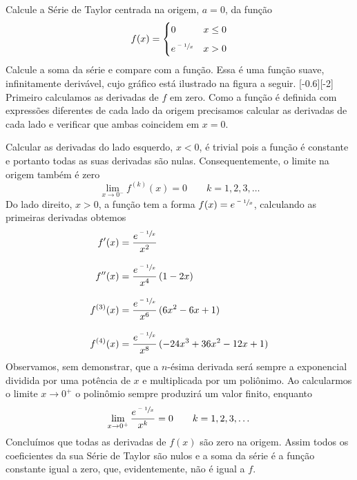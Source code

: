 \begin{example}
  Calcule a Série de Taylor centrada na origem, $a=0$, da função
  \[
    f(x) = \begin{cases}
      0                 & x \leq 0 \\[2mm]
      e^{\sfrac{-1}{x}} & x > 0
    \end{cases}
  \]
  Calcule a soma da série e compare com a função.
  \solution
  Essa é uma função suave, infinitamente derivável, cujo gráfico está
  ilustrado na figura a seguir.
  [-0.6][-2]
  Primeiro calculamos as derivadas de $f$ em zero. Como a função é definida
  com expressões diferentes de cada lado da origem precisamos calcular as derivadas
  de cada lado e verificar que ambas coincidem em $x=0$.

  Calcular as derivadas do lado esquerdo, $x<0$, é trivial pois a função é constante
  e portanto todas as suas derivadas são nulas. Consequentemente, o limite
  na origem também é zero
  \[
    \lim_{x\to 0^-} f^{(k)}(x) = 0 \qquad k = 1, 2, 3, \dots
  \]
  Do lado direito, $x>0$, a função tem a forma \(f(x) = e^{\sfrac{-1}{x}}\), calculando as
  primeiras derivadas obtemos
  \begin{align*}
    f'(x)      & = \frac{e^{\sfrac{-1}{x}}}{x^2}                       \\[3mm]
    f''(x)     & = \frac{e^{\sfrac{-1}{x}}}{x^4}\,(1-2x)               \\[3mm]
    f^{(3)}(x) & = \frac{e^{\sfrac{-1}{x}}}{x^6}\,(6x^2-6x+1)          \\[3mm]
    f^{(4)}(x) & = \frac{e^{\sfrac{-1}{x}}}{x^8}\,(-24x^3+36x^2-12x+1)
  \end{align*}
  Observamos, sem demonstrar, que a $n$-ésima derivada será sempre a exponencial
  dividida por uma potência de $x$ e multiplicada por um poliônimo.
  Ao calcularmos o limite $x\to 0^+$ o polinômio sempre produzirá um
  valor finito, enquanto
  \[
    \lim_{x\to 0^+}\frac{e^{\sfrac{-1}{x}}}{x^k} = 0 \qquad k = 1, 2, 3, \dots
  \]
  Concluímos que todas as derivadas de $f(x)$ são zero na origem.
  Assim todos os coeficientes da sua Série de Taylor são nulos e a soma da
  série é a função constante igual a zero, que, evidentemente, não é igual a $f$.
\end{example}

